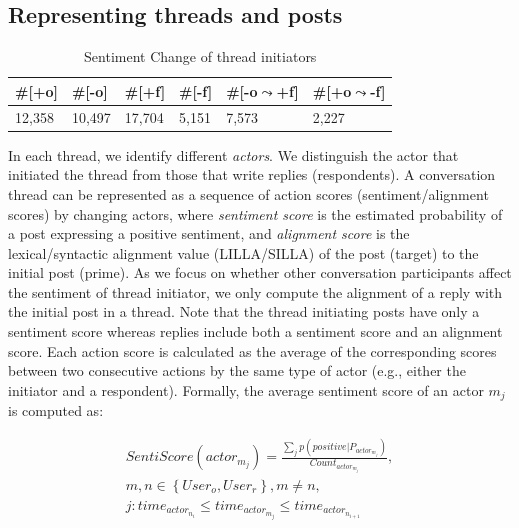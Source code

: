\documentclass[man,biblatex,floatsintext]{apa6}
\newcommand{\up}{\vspace*{-12pt}}
\begin{document}
\subsection{Representing threads and posts}

\begin{table}[]
\centering
\begin{tabular}{|l|l|l|l|l|l|}
\hline
\#{[}+o{]} & \#{[}-o{]} & \#{[}+f{]} & \#{[}-f{]} & \#{[}-o$\leadsto$+f{]} & \#{[}+o$\leadsto$-f{]} \\ \hline
12,358        &    10,497        &   17,704         &       5,151     &        7,573                   &               2,227            \\ \hline
\end{tabular}
\caption{\label{tab:SentiChange}Sentiment Change of thread initiators}
\up
\end{table}

In each thread, we identify different \emph{actors}.  We distinguish the actor that initiated the thread from those that write replies (respondents). A conversation thread can be represented as a sequence of action scores (sentiment/alignment scores) by changing actors, where \emph{sentiment score} is the estimated probability of a post expressing a positive sentiment, and \emph{alignment score} is the lexical/syntactic alignment value (LILLA/SILLA) of the post (target) to the initial post (prime). As we focus on whether other conversation participants affect the sentiment of thread initiator, we only compute the alignment of a reply with the initial post in a thread. Note that the thread initiating posts have only a sentiment score whereas replies include both a sentiment score and an alignment score. Each action score is calculated as the average of the corresponding scores between two consecutive actions by the same type of actor (e.g., either the initiator and a respondent). Formally, the average sentiment score of an actor $m_{j}$ is computed as:

\begin{equation} 
\begin{split}
SentiScore(actor_{m_{j}}) = \frac{\sum_{j}  p(positive|P_{actor_{m_{j}}})}{Count_{actor_{m_{j}}}},\\ m,n \in \left \{User_{o}, User_{r} \right \}, m \neq n, \\ j:time_{actor_{n_{i}}} \leq time_{actor_{m_{j}}} \leq time_{actor_{n_{i+1}}}
\end{split}
\end{equation}
\end{document}
